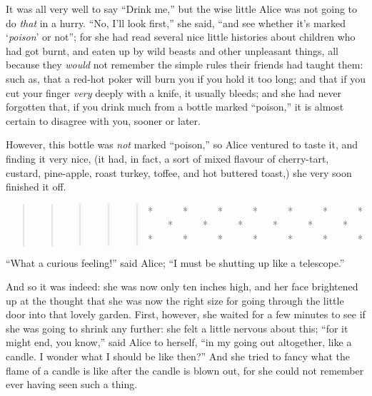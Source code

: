 \documentclass[11pt,openany,oneside]{book}
\begin{document}
It was all very well to say “Drink me,” but the wise little Alice was not going to do {\em that\/} in a hurry. “No, I’ll look first,” she said, “and see whether it’s marked ‘{\em poison\/}’ or not”; for she had read several nice little histories about children who had got burnt, and eaten up by wild beasts and other unpleasant things, all because they {\em would\/} not remember the simple rules their friends had taught them: such as, that a red-hot poker will burn you if you hold it too long; and that if you cut your finger {\em very\/} deeply with a knife, it usually bleeds; and she had never forgotten that, if you drink much from a bottle marked “poison,” it is almost certain to disagree with you, sooner or later. 

However, this bottle was {\em not\/} marked “poison,” so Alice ventured to taste it, and finding it very nice, (it had, in fact, a sort of mixed flavour of cherry-tart, custard, pine-apple, roast turkey, toffee, and hot buttered toast,) she very soon finished it off. 

\begin{quote}
\begin{quote}
\begin{quote}
\begin{quote}
\begin{quote}
*~~~~~~*~~~~~~*~~~~~~*~~~~~~*~~~~~~*~~~~~~*\newline
 \newline
 ~~~~*~~~~~~*~~~~~~*~~~~~~*~~~~~~*~~~~~~*\newline
 \newline
 *~~~~~~*~~~~~~*~~~~~~*~~~~~~*~~~~~~*~~~~~~*

\end{quote}
\end{quote}
\end{quote}
\end{quote}
\end{quote}
“What a curious feeling!” said Alice; “I must be shutting up like a telescope.” 

And so it was indeed: she was now only ten inches high, and her face brightened up at the thought that she was now the right size for going through the little door into that lovely garden. First, however, she waited for a few minutes to see if she was going to shrink any further: she felt a little nervous about this; “for it might end, you know,” said Alice to herself, “in my going out altogether, like a candle. I wonder what I should be like then?” And she tried to fancy what the flame of a candle is like after the candle is blown out, for she could not remember ever having seen such a thing. 
\end{document}
